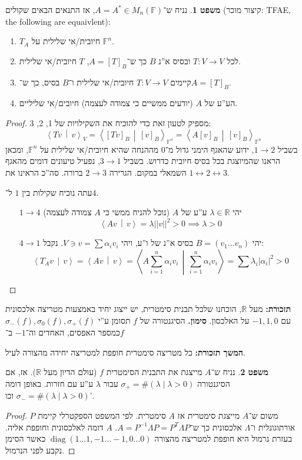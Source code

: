 \documentclass[a4paper]{article}
\newcommand\R     {\mathbb{R}}
\newcommand\ra    {\rangle}
\newcommand\la    {\langle}
\newcommand\sumnio    {\sum_{i = 1}^{n}}
\DeclareMathOperator{\diag}    {diag}
\newcommand\lra       {\leftrightarrow}
\newcommand\F         {\mathbb{F}}
\newcommand\co        {\colon}
\newcommand\norm[1]   {\left \vert \left \vert #1 \right \vert \right \vert}
\newcommand\mut [2]   {\left \la #1 \,\middle\vert\, #2 \right \ra}
\newcommand\ag        {\alpha}
\renewcommand\lg      {\lambda}
\newcommand\sg        {\sigma}
\newcommand\Lg        {\Lambda}
\newcommand\op    {^{-1}}
\theoremstyle{definition}
\newtheorem{Theorem}{משפט}
\newcommand\theo  [1] {\begin{Theorem}#1\end{Theorem}}
\begin{document}
	\theo{נניח ש־$A = A^* \in M_n(\F)$, אז התנאים הבאים שקולים (קיצור מוכר: TFAE, the following are equaivlent): 
		\begin{enumerate}
			\item $T_A$ חיובית/אי שלילית על $\F^n$. 
			\item לכל $T \co V \to V$ ובסיס א''נ $B$ כך ש־$A = [T]_B$, $T$ חיובית/אי שלילית. 
			\item קיימים $T \co V \to V$ חיובית/אי שלילית ו־$B$ בסיס, כך ש־$A = [T]_B$. 
			\item הע''ע של $A$ (יודעים ממשיים כי צמודה לעצמה) חיובים/אי שליליים. 
	\end{enumerate}}
	\begin{proof}
		מספיק לטעון זאת כדי להוכיח את השקילויות של 1, 2, 3: 
		\[ \mut{Tv}{v}_V = \mut{[Tv]_B}{[v]_B}_{\F^n} = \mut{A[v]_B}{[v]_B}_{\F^n} \]
		בשביל $1 \to 2$, ידוע שהאגף הימני גדול מ־$0$ מההנחה שהיא חיובית/אי שלילית על $\F^n$, ומכאן הראנו שהמיוצגת בכל בסיס חיובית כדרוש. בשביל $3 \to 1$, נפעיל טיעונים דומים מהאגף השמאלי במקום. הגרירה $2 \to 3$ ברורה. סה''כ הראינו את $1\lra2\lra 3$. 
		
		עתה נוכיח שקילות בין $1$ ל־$4$. 
		\begin{itemize}
			\item[$1 \to 4$] יהי $\lg \in \R$ ע''ע של $A$ (נוכל להניח ממשי כי $A$ צמודה לעצמה)
			\[ \mut{Av}{v} = \lg\norm{v}^2 > 0 \implies \lg > 0 \]
			\item[$4 \to 1$] יהי $B = (v_1 \dots v_n)$ בסיס א''נ של ו''ע, ויהי $V \ni v = \sum \ag_i v_i$. נקבל: 
			\[ \mut{T_Av}{v} = \mut{Av}{v} = \mut{A\sumnio \ag_i v_i}{\sumnio \ag_i v_i} = \sum \lg_i |\ag_i|^2 > 0 \]
		\end{itemize}
	\end{proof}
	
	\textbf{תזכורת: }מעל $\R$, הוכחנו שלכל תבנית סימטרית, יש ייצוג יחיד באמצעות מטריצה אלכסונית עם $-1, 1, 0$ על האלכסון. 
	\textbf{סימון. }{הסיגנטורה של $f$ תסומן ע''י $\sg_-(f), \sg_0(f), \sg_+(f)$ כמספר האפסים, האחדים וה־$-1$ ב־$f$}
	
	\textbf{המשך תזכורת: }כל מטריצה סימטרית חופפת למטריצה יחידה מהצורה לעיל. 
	
	\theo{נניח ש־$A$ מייצגת את התבנית הסימטרית $f$ (עולם הדיון מעל $\R$). אז, אם הסיגנטורה $\sg_+ = \#(\lg \mid \lg > 0)$ עבור $\lg$ ע''ע עם חזרות. באופן דומה $\sg_- = \#(\lg \mid \lg > 0)$ וכו'. }
	
	\begin{proof}
		משום ש־$A$ מייצגת סימטרית אז $A$ סימטרית. לפי המשפט הספקטרלי קיימת $P$ אורתוגונלית ו־$\Lg$ אלכסונית כך ש־$A = P\op\Lg P = P^T\Lg P$. $A$ דומה לאלכסונית וחופפת אליה. בעזרת נרמול היא חופפת למטריצה מהצורה $\diag(1 \dots 1, -1 \ldots -1, 0 \ldots 0)$ כאשר הסימן נקבע לפני הנרמול. 
	\end{proof}
	
\end{document}
